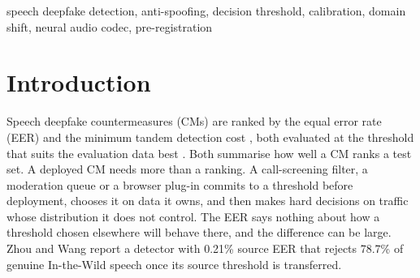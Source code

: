 \documentclass[conference]{IEEEtran}
\begin{document}
\begin{IEEEkeywords}
speech deepfake detection, anti-spoofing, decision threshold, calibration,
domain shift, neural audio codec, pre-registration
\end{IEEEkeywords}

\section{Introduction}
\label{sec:intro}
Speech deepfake countermeasures (CMs) are ranked by the equal error rate (EER)
and the minimum tandem detection cost \cite{kinnunen18_tdcf}, both evaluated at
the threshold that suits the evaluation data best
\cite{wang20_asvspoof2019,liu23_asvspoof2021}. Both summarise how well a CM
ranks a test set. A deployed CM needs more than a ranking. A call-screening
filter, a moderation queue or a browser plug-in \cite{pascu25_edge_plugin}
commits to a threshold before deployment, chooses it on data it owns, and then
makes hard decisions on traffic whose distribution it does not control. The EER
says nothing about how a threshold chosen elsewhere will behave there, and the
difference can be large. Zhou and Wang \cite{zhou26_eer_hides} report a detector with
0.21\% source EER that rejects 78.7\% of genuine In-the-Wild speech once its
source threshold is transferred.
\end{document}
